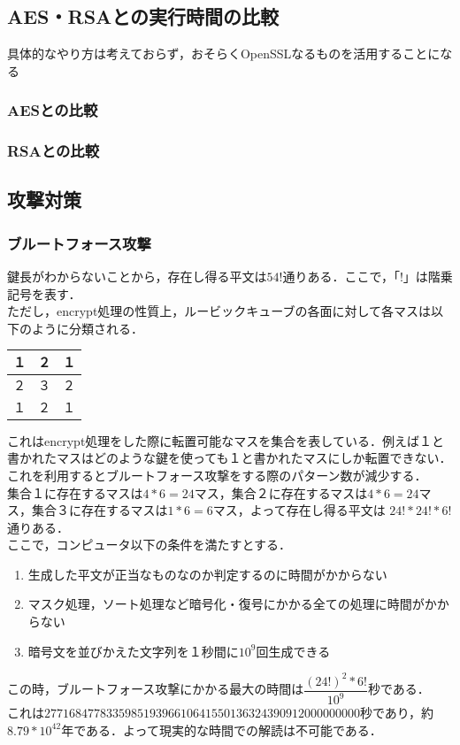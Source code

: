 \documentclass{jsarticle}
\begin{document}
\subsection{AES・RSAとの実行時間の比較}
具体的なやり方は考えておらず，おそらくOpenSSLなるものを活用することになる
\subsubsection{AESとの比較}
\subsubsection{RSAとの比較}

\subsection{攻撃対策}
\subsubsection{ブルートフォース攻撃}

鍵長がわからないことから，存在し得る平文は$54!$通りある．ここで，「$!$」は階乗記号を表す．\\
ただし，encrypt処理の性質上，ルービックキューブの各面に対して各マスは以下のように分類される．
\begin{table}[htb]
  \begin{tabular}{|l|c|r|} \hline
    １ & ２ & １ \\ \hline
    ２ & ３ & ２ \\ \hline
    １ & ２ & １ \\ \hline
  \end{tabular}
\end{table}
これはencrypt処理をした際に転置可能なマスを集合を表している．例えば１と書かれたマスはどのような鍵を使っても１と書かれたマスにしか転置できない．これを利用するとブルートフォース攻撃をする際のパターン数が減少する．\\
集合１に存在するマスは$4*6=24$マス，集合２に存在するマスは$4*6=24$マス，集合３に存在するマスは$1*6=6$マス，よって存在し得る平文は $24!*24!*6!$通りある．\\
ここで，コンピュータ以下の条件を満たすとする．
\begin{enumerate}
  \item 生成した平文が正当なものなのか判定するのに時間がかからない
  \item マスク処理，ソート処理など暗号化・復号にかかる全ての処理に時間がかからない
  \item 暗号文を並びかえた文字列を１秒間に$10^9$回生成できる
\end{enumerate}
この時，ブルートフォース攻撃にかかる最大の時間は$\dfrac{(24!)^2*6!}{10^9}$秒である．\\
これは$277168477833598519396610641550136324390912000000000$秒であり，約$8.79*10^{42}$年である．よって現実的な時間での解読は不可能である．
\end{document}

